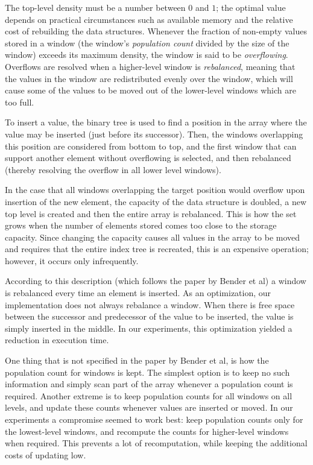 \documentclass{acm_proc_article-sp}
\begin{document}
The top-level density must be a number between $0$ and $1$; the optimal value
depends on practical circumstances such as available memory and the relative
cost of rebuilding the data structures.
Whenever the fraction of non-empty values stored in a window (the window's
\emph{population count} divided by the size of the window) exceeds its maximum
density, the window is said to be \emph{overflowing}.
Overflows are resolved when a higher-level window is \emph{rebalanced},
meaning that the values in the window are redistributed evenly over the window,
which will cause some of the values to be moved out of the lower-level windows
which are too full.

To insert a value, the binary tree is used to find a position in the array
where the value may be inserted (just before its successor). Then, the windows
overlapping this position are considered from bottom to top, and the first
window that can support another element without overflowing is selected, and
then rebalanced (thereby resolving the overflow in all lower level windows).

In the case that all windows overlapping the target position would overflow upon
insertion of the new element, the capacity of the data structure is doubled,
a new top level is created and then the entire array is rebalanced. This is how
the set grows when the number of elements stored comes too close to the storage
capacity. Since changing the capacity causes all values in the array to be moved
and requires that the entire index tree is recreated, this is an expensive
operation; however, it occurs only infrequently.

According to this description (which follows the paper by Bender et al) a window
is rebalanced every time an element is inserted. As an optimization, our
implementation does not always rebalance a window. When there is free space
between the successor and predecessor of the value to be inserted, the value
is simply inserted in the middle. In our experiments, this optimization
yielded a reduction in execution time.

One thing that is not specified in the paper by Bender et al, is how the
population count for windows is kept. The simplest option is to keep no such
information and simply scan part of the array whenever a population count is
required. Another extreme is to keep population counts for all windows on all
levels, and update these counts whenever values are inserted or moved. In
our experiments a compromise seemed to work best: keep population counts only
for the lowest-level windows, and recompute the counts for higher-level windows
when required. This prevents a lot of recomputation, while keeping the additional
costs of updating low.
\end{document}
